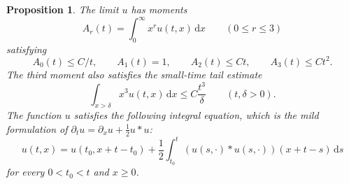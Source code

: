 \documentclass[11pt,letterpaper,reqno]{amsart}
\numberwithin{equation}{section}
\theoremstyle{plain}
\newtheorem{proposition}[theorem]{Proposition}
\theoremstyle{remark}
\newcommand{\dd}{\,\mathrm d}
\begin{document}
\begin{proposition}\label{prop:limit}
The limit $u$ has moments
\[
 A_r(t)=\int_0^\infty x^ru(t,x)\dd x\qquad(0\le r\le3)
\]
satisfying
\begin{equation}\label{eq:Amoment}
 A_0(t)\le C/t,\qquad A_1(t)=1,\qquad A_2(t)\le Ct,\qquad A_3(t)\le Ct^2.
\end{equation}
The third moment also satisfies the small-time tail estimate
\begin{equation}\label{eq:limitthirdtail}
 \int_{x>\delta}x^3u(t,x)\dd x\le C\frac{t^3}{\delta}\qquad(t,\delta>0).
\end{equation}
The function $u$ satisfies the following integral equation, which is the mild formulation of $\partial_t u = \partial_x u + \frac{1}{2} u*u$:
\begin{equation}\label{eq:mild}
 u(t,x)=u(t_0,x+t-t_0)+\frac12\int_{t_0}^t(u(s,\cdot)*u(s,\cdot))(x+t-s)\dd s
\end{equation}
for every $0<t_0<t$ and $x\ge0$.
\end{proposition}
\end{document}
